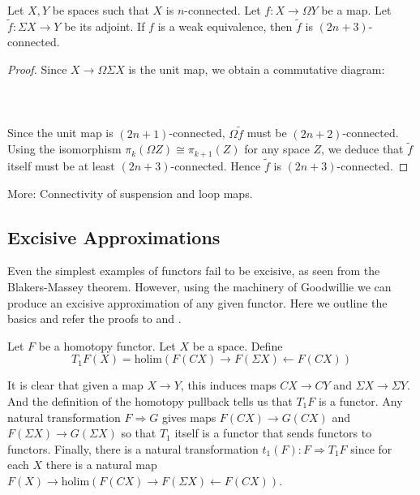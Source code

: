 \begin{crl}\label{crl:AdjointConn} Let $X,Y$ be spaces such that $X$ is $n$-connected. Let $f:X\to\Omega Y$ be a map. Let $\widetilde{f}:\Sigma X\to Y$ be its adjoint. If $f$ is a weak equivalence, then $\widetilde{f}$ is $(2n+3)$-connected. 
\begin{proof}
Since $X\to\Omega\Sigma X$ is the unit map, we obtain a commutative diagram:  
 \\~\\  \\~\\
Since the unit map is $(2n+1)$-connected, $\Omega\widetilde{f}$ must be $(2n+2)$-connected. Using the isomorphism $\pi_k(\Omega Z)\cong\pi_{k+1}(Z)$ for any space $Z$, we deduce that $\widetilde{f}$ itself must be at least $(2n+3)$-connected. Hence $\widetilde{f}$ is $(2n+3)$-connected. 
\end{proof}
\end{crl}

More: Connectivity of suspension and loop maps. 

\subsection{Excisive Approximations}
Even the simplest examples of functors fail to be excisive, as seen from the Blakers-Massey theorem. However, using the machinery of Goodwillie we can produce an excisive approximation of any given functor. Here we outline the basics and refer the proofs to \cite{CHT} and \cite{GW3}. 

\begin{defn}\label{defn:T1}Let $F$ be a homotopy functor. Let $X$ be a space.  Define $$T_1F(X)=\text{holim}(F(CX)\rightarrow F(\Sigma X)\leftarrow F(CX))$$
\end{defn}

It is clear that given a map $X\to Y$, this induces maps $CX\to CY$ and $\Sigma X\to\Sigma Y$. And the definition of the homotopy pullback tells us that $T_1F$ is a functor. Any natural transformation $F\Rightarrow G$ gives maps $F(CX)\to G(CX)$ and $F(\Sigma X)\to G(\Sigma X)$ so that $T_1$ itself is a functor that sends functors to functors. Finally, there is a natural transformation $t_1(F):F\Rightarrow T_1F$ since for each $X$ there is a natural map $F(X)\to\text{holim}(F(CX)\rightarrow F(\Sigma X)\leftarrow F(CX))$. 

